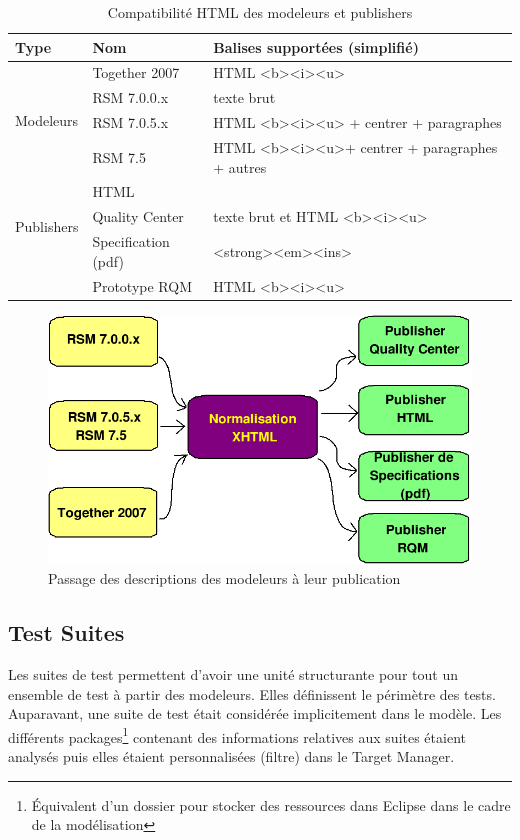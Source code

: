 \begin{table}[!ht]
\caption{\label{tableau:compatDescHTML}Compatibilité HTML des modeleurs et publishers}
\begin{tabular}{|l|l|l|}
  \hline
  Type & Nom & Balises supportées (simplifié) \\
  \hline
  \hline
  \multirow{4}{*}{Modeleurs} & Together 2007 & HTML <b><i><u> \\
    & RSM 7.0.0.x & texte brut\\
    & RSM 7.0.5.x & HTML <b><i><u> + centrer + paragraphes\\ 
   & RSM 7.5 &  HTML <b><i><u>+ centrer + paragraphes + autres\\ \hline
  \multirow{3}{*}{Publishers} & HTML &  \\
    & Quality Center & texte brut et HTML <b><i><u> \\
    & Specification (pdf) & <strong><em><ins>  \\
    & Prototype RQM &  HTML <b><i><u> \\ \hline
\end{tabular}
\end{table}


\begin{figure}[!ht]
\centering
\includegraphics[scale=0.5]{Illustrations/bigDescSchema.png}
\caption{Passage des descriptions des modeleurs à leur publication}
\label{figure:descXHTMLPublisher}
\end{figure}

\subsection{Test Suites}
Les suites de test permettent d'avoir une unité structurante pour tout un ensemble de test à partir des modeleurs. Elles définissent le périmètre des tests. Auparavant, une suite de test était considérée implicitement dans le modèle. Les différents packages\footnote{Équivalent d'un dossier pour stocker des ressources dans Eclipse dans le cadre de la modélisation} contenant des informations relatives aux suites étaient analysés puis elles étaient personnalisées (filtre) dans le Target Manager. 

